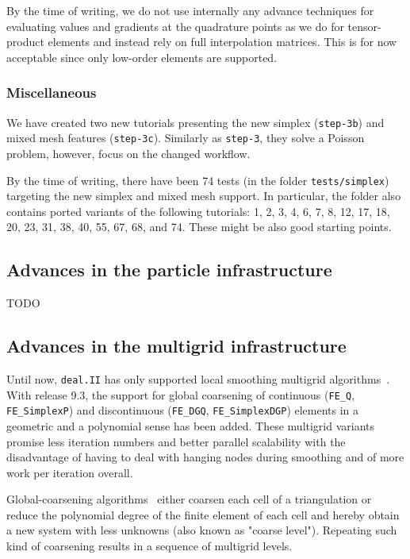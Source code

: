 \documentclass{ansarticle-preprint}
\newcommand{\specialword}[1]{\texttt{#1}}
\newcommand{\dealii}{{\specialword{deal.II}}\xspace}
\begin{document}
By the time of writing, we do not use internally any advance techniques for evaluating values and
gradients at the quadrature points as we do for tensor-product elements and
instead rely on full interpolation matrices. This is for now acceptable since only low-order elements are
supported.

\subsubsection{Miscellaneous}

We have created two new tutorials presenting the new simplex (\texttt{step-3b}) and mixed mesh features
(\texttt{step-3c}). Similarly as \texttt{step-3}, they solve a Poisson problem, however, focus
on the changed workflow.

By the time of writing, there have been 74 tests (in the folder \texttt{tests/simplex})
targeting the new simplex and mixed mesh support. In particular, the folder also
contains ported variants of the following tutorials: 1, 2, 3, 4, 6, 7, 8, 12, 17, 18, 20, 23, 31, 38,
40, 55, 67, 68, and 74. These might be also good starting points.


\subsection{Advances in the particle infrastructure}
\label{subsec:particles}

TODO

\subsection{Advances in the multigrid infrastructure}
\label{subsec:mg}

Until now, \dealii has only supported local smoothing multigrid algorithms~\citep{ClevengerHeisterKanschatKronbichler2019}. With release 9.3, the support for global coarsening of continuous (\texttt{FE\_Q}, \texttt{FE\_SimplexP}) and discontinuous (\texttt{FE\_DGQ}, \texttt{FE\_SimplexDGP}) elements  in a geometric and a polynomial sense has been added. These multigrid variants promise less iteration numbers and better parallel scalability with the disadvantage of having to deal with hanging nodes during smoothing and of more work per iteration overall.

Global-coarsening algorithms~\citep{becker00} either coarsen each cell of a triangulation or reduce the polynomial degree of the finite element of each cell and hereby obtain a new system with less unknowns (also known as "coarse level").
Repeating such kind of coarsening results in a sequence of multigrid levels.
\end{document}
